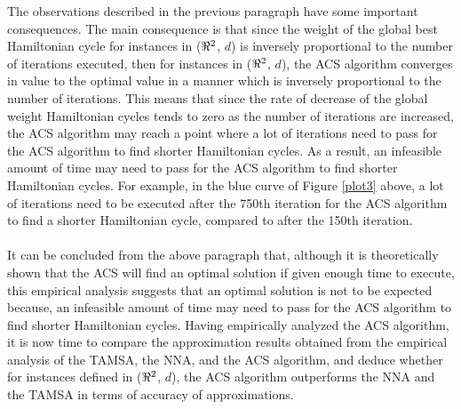 \documentclass[12pt]{article}
\numberwithin{equation}{subsection}
\numberwithin{table}{subsection}
\numberwithin{algorithm}{subsection}
\numberwithin{figure}{subsection}
\begin{document}
The observations described in the previous paragraph have some important consequences. The main consequence is that  since the weight of the global best Hamiltonian cycle for instances in ($\real^2$, $d$) is inversely proportional to the number of iterations executed, then for instances in ($\real^2$, $d$), the ACS algorithm converges in value to the optimal value in a manner which is inversely proportional to the number of iterations. This means that since the rate of decrease of the global weight Hamiltonian cycles tends to zero as the number of iterations are increased, the ACS algorithm may reach a point where a lot of iterations need to pass for the ACS algorithm to find shorter Hamiltonian cycles. As a result, an infeasible amount of time may need to pass for the ACS algorithm to find shorter Hamiltonian cycles. For example, in the blue curve of Figure \ref{plot3} above, a lot of iterations need to be executed after the 750th iteration for the ACS algorithm to find a shorter Hamiltonian cycle, compared to after the 150th iteration.\\\\
It can be concluded from the above paragraph that, although it is theoretically shown that the ACS will find an optimal solution if given enough time to execute, this empirical analysis suggests that an optimal solution is not to be expected because, an infeasible amount of time may need to pass for the ACS algorithm to find shorter Hamiltonian cycles. Having empirically analyzed the ACS algorithm, it is now time to compare the approximation results obtained from the empirical analysis of the TAMSA, the NNA, and the ACS algorithm, and deduce whether for instances defined in ($\real^2$, $d$), the ACS algorithm outperforms the NNA and the TAMSA in terms of accuracy of approximations. 
\end{document}
